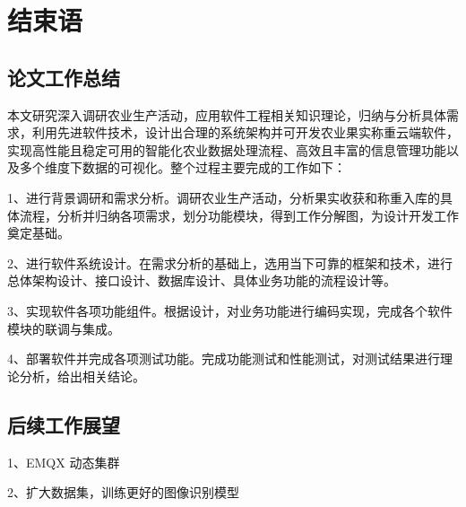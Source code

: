 \chapter{结束语}

\section{论文工作总结}

本文研究深入调研农业生产活动，应用软件工程相关知识理论，归纳与分析具体需求，利用先进软件技术，设计出合理的系统架构并可开发农业果实称重云端软件，实现高性能且稳定可用的智能化农业数据处理流程、高效且丰富的信息管理功能以及多个维度下数据的可视化。整个过程主要完成的工作如下：

1、进行背景调研和需求分析。调研农业生产活动，分析果实收获和称重入库的具体流程，分析并归纳各项需求，划分功能模块，得到工作分解图，为设计开发工作奠定基础。

2、进行软件系统设计。在需求分析的基础上，选用当下可靠的框架和技术，进行总体架构设计、接口设计、数据库设计、具体业务功能的流程设计等。

3、实现软件各项功能组件。根据设计，对业务功能进行编码实现，完成各个软件模块的联调与集成。

4、部署软件并完成各项测试功能。完成功能测试和性能测试，对测试结果进行理论分析，给出相关结论。

\section{后续工作展望}

1、EMQX 动态集群

2、扩大数据集，训练更好的图像识别模型